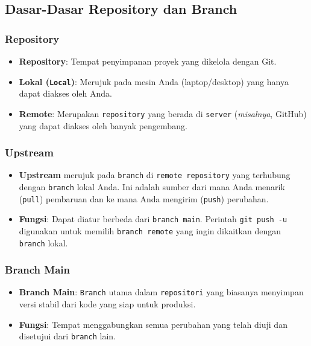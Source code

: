 \documentclass{article}
\begin{document}
\subsection{Dasar-Dasar Repository dan Branch}

\subsubsection{Repository}
\begin{itemize}
    \item \textbf{Repository}: Tempat penyimpanan proyek yang dikelola dengan Git.
    \item \textbf{Lokal (\texttt{Local})}: Merujuk pada mesin Anda (laptop/desktop) yang hanya dapat diakses oleh Anda.
    \item \textbf{Remote}: Merupakan \texttt{repository} yang berada di \texttt{server} (\textit{misalnya}, GitHub) yang dapat diakses oleh banyak pengembang.
\end{itemize}

\subsubsection{Upstream}
\begin{itemize}
    \item \textbf{Upstream} merujuk pada \texttt{branch} di \texttt{remote repository} yang terhubung dengan \texttt{branch} lokal Anda. Ini adalah sumber dari mana Anda menarik (\texttt{pull}) pembaruan dan ke mana Anda mengirim (\texttt{push}) perubahan.
    \item \textbf{Fungsi}: Dapat diatur berbeda dari \texttt{branch main}. Perintah \texttt{git push -u} digunakan untuk memilih \texttt{branch remote} yang ingin dikaitkan dengan \texttt{branch} lokal.
\end{itemize}

\subsubsection{Branch Main}
\begin{itemize}
    \item \textbf{Branch Main}: \texttt{Branch} utama dalam \texttt{repositori} yang biasanya menyimpan versi stabil dari kode yang siap untuk produksi.
    \item \textbf{Fungsi}: Tempat menggabungkan semua perubahan yang telah diuji dan disetujui dari \texttt{branch} lain.
\end{itemize}
\end{document}
